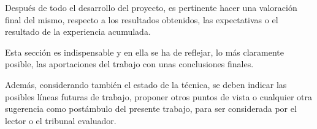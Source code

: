 

Después de todo el desarrollo del proyecto, es pertinente hacer una
valoración final del mismo, respecto a los resultados obtenidos, las
expectativas o el resultado de la experiencia acumulada.

Esta sección es indispensable y en ella se ha de reflejar, lo más
claramente posible, las aportaciones del trabajo con unas conclusiones
finales.

Además, considerando también el estado de la técnica, se deben indicar
las posibles líneas futuras de trabajo, proponer otros puntos de vista
o cualquier otra sugerencia como postámbulo del presente trabajo, para
ser considerada por el lector o el tribunal evaluador.


\chapterend

